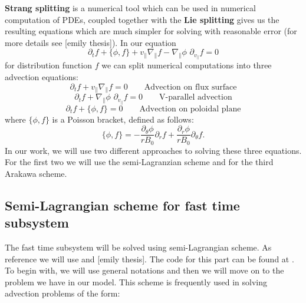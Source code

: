 \textbf{Strang splitting} is a numerical tool which can be used in numerical computation of PDEs, coupled together with the \textbf{Lie splitting} gives us the resulting equations which are much simpler for solving with reasonable error (for more details see [emily thesis]). In our equation 
\begin{equation}
 \partial_t f + \{\phi, f \} + v_\parallel \nabla_\parallel f - \nabla_\parallel \phi\,\, \partial_{v_\parallel} f = 0
\end{equation}
for distribution function $f$ we can split numerical computations into three advection equations:
\begin{equation}
 \partial_t f + v_\parallel \nabla_\parallel f = 0 \qquad \text{Advection on flux surface}
\end{equation}
\begin{equation}
 \partial_t f + \nabla_\parallel \phi\,\, \partial_{v_{\parallel}} f = 0 \qquad \text{V-parallel advection}
 \end{equation}
\begin{equation}
 \partial_t f + \{\phi, f\} = 0 \qquad \text{Advection on poloidal plane}
\end{equation}
where $\{\phi,f\}$ is a Poisson bracket, defined as follows:
\begin{equation}
 \{\phi,f\}=-\frac{\partial_\theta\phi}{rB_0}\partial_r f + \frac{\partial_r\phi}{rB_0}\partial_\theta f.
\end{equation}
In our work, we will use two different approaches to solving these three equations. For the first two we will use the semi-Lagranzian scheme and for the third Arakawa scheme.

\subsection{Semi-Lagrangian scheme for fast time subsystem}
The fast time subsystem will be solved using semi-Lagrangian scheme. As reference we will use \cite{campospinto} and [emily thesis]. The code for this part can be found at \cite{pygyro_code}. To begin with, we will use general notations and then we will move on to the problem we have in our model. This scheme is frequently used in solving advection problems of the form:

